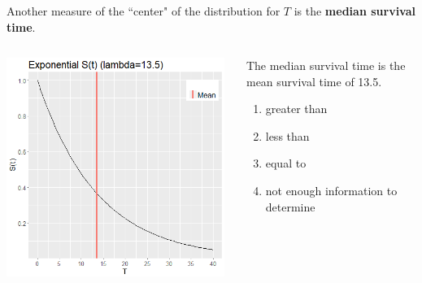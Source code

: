 \begin{frame}
\frametitle{\grp}
Another measure of the ``center" of the distribution for $T$ is the \textbf{median survival time}.
\vskip10pt
\begin{columns}
\includegraphics[width=0.98\textwidth]{Figures/expsurv_mean.png}
\begin{clicker}{The median survival time is \underline{\hspace{0.5in}} the mean survival time of 13.5.}
\begin{enumerate}
\item greater than
\item less than %
\item equal to
\item not enough information to determine
\end{enumerate}
\end{clicker}
\end{columns}
\end{frame}

